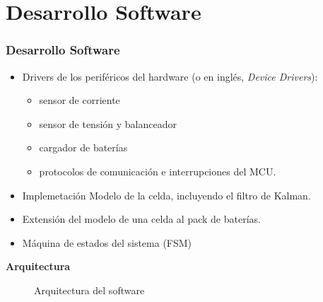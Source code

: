 \documentclass[10pt]{beamer}
\theoremstyle{remark}
\theoremstyle{definition}
\begin{document}
\section{Desarrollo Software}
\begin{frame}%
    \frametitle{Desarrollo Software}
    \small
    \begin{itemize}
        \item Drivers de los perif\'ericos del hardware (o en ingl\'es, \emph{Device
            Drivers}):
            \begin{itemize}
                \item sensor de corriente
                \item sensor de tensi\'on y balanceador
                \item cargador de bater\'ias
                \item protocolos de comunicaci\'on e interrupciones del MCU.
            \end{itemize}
        \item Implemetación Modelo de la celda, incluyendo el filtro de Kalman.
        \item Extensi\'on del modelo de una celda al pack de bater\'ias.
        \item M\'aquina de estados del sistema (FSM)
        \end{itemize}

    \textbf{Arquitectura}
    \begin{figure}[h!]
        \begin{center}
            \caption{Arquitectura del software}
            \label{stack_fw}
        \end{center}
    \end{figure}
\end{frame}
\end{document}
